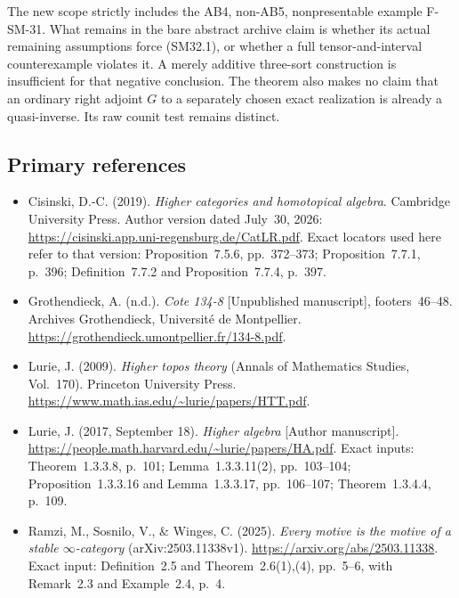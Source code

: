 The new scope strictly includes the AB4, non-AB5,
nonpresentable example F-SM-31.  What remains in the bare
abstract archive claim is whether its actual remaining
assumptions force (SM32.1), or whether a full tensor-and-interval
counterexample violates it.  A merely additive three-sort
construction is insufficient for that negative conclusion.
The theorem also makes no claim that an ordinary right adjoint
\(G\) to a separately chosen exact realization is already a
quasi-inverse.  Its raw counit test remains distinct.

\subsection{Primary references}
\begin{itemize}
\item Cisinski, D.-C. (2019). \emph{Higher categories and
homotopical algebra}. Cambridge University Press.
Author version dated July~30, 2026:
\url{https://cisinski.app.uni-regensburg.de/CatLR.pdf}.
Exact locators used here refer to that version:
Proposition~7.5.6, pp.~372--373; Proposition~7.7.1, p.~396;
Definition~7.7.2 and Proposition~7.7.4, p.~397.
\item Grothendieck, A. (n.d.). \emph{Cote 134-8}
[Unpublished manuscript], footers~46--48.
Archives Grothendieck, Universit\'e de Montpellier.
\url{https://grothendieck.umontpellier.fr/134-8.pdf}.
\item Lurie, J. (2009). \emph{Higher topos theory}
(Annals of Mathematics Studies, Vol.~170).
Princeton University Press.
\url{https://www.math.ias.edu/~lurie/papers/HTT.pdf}.
\item Lurie, J. (2017, September 18). \emph{Higher algebra}
[Author manuscript].
\url{https://people.math.harvard.edu/~lurie/papers/HA.pdf}.
Exact inputs: Theorem~1.3.3.8, p.~101;
Lemma~1.3.3.11(2), pp.~103--104;
Proposition~1.3.3.16 and Lemma~1.3.3.17, pp.~106--107;
Theorem~1.3.4.4, p.~109.
\item Ramzi, M., Sosnilo, V., \& Winges, C. (2025).
\emph{Every motive is the motive of a stable
\(\infty\)-category} (arXiv:2503.11338v1).
\url{https://arxiv.org/abs/2503.11338}.
Exact input: Definition~2.5 and Theorem~2.6(1),(4),
pp.~5--6, with Remark~2.3 and Example~2.4, p.~4.
\end{itemize}
